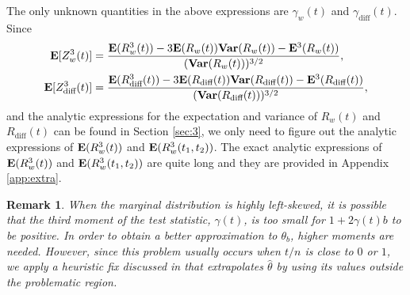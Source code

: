 \documentclass[arxiv, preprint]{imsart}
\numberwithin{equation}{section}
\theoremstyle{plain}
\newtheorem{remark}[thm]{Remark}
\begin{document}
The only unknown quantities in the above expressions are $\gamma_w(t)$ and $\gamma_\text{diff}(t)$.  %
Since 
\begin{align*}
 \mathbf{E}[Z^3_w(t)] & = \frac{\mathbf{E}(R^3_w(t))-3\mathbf{E}(R_w(t))\text{\bf{Var}}(R_w(t)) - \mathbf{E}^3(R_w(t))}{(\text{\bf{Var}}(R_w(t)))^{3/2}}, \\
\mathbf{E}[Z^3_\text{diff}(t)] & = \frac{\mathbf{E}(R^3_\text{diff}(t))-3\mathbf{E}(R_\text{diff}(t))\text{\bf{Var}}(R_\text{diff}(t)) - \mathbf{E}^3(R_\text{diff}(t))}{(\text{\bf{Var}}(R_\text{diff}(t)))^{3/2}},
\end{align*}
and the analytic expressions for the expectation and variance of $R_w(t)$ %
and $R_\text{diff}(t)$ can be found in Section \ref{sec:3}, we only need to figure out the analytic expressions of $\mathbf{E}(R^3_w(t))$ and $\mathbf{E}(R^3_w(t_1,t_2))$. The exact analytic expressions of $\mathbf{E}(R^3_w(t))$ and $\mathbf{E}(R^3_w(t_1,t_2))$ are quite long and they are provided in Appendix \ref{app:extra}. %

\begin{remark}
When the marginal distribution is highly left-skewed, it is possible that the third moment of the test statistic, $\gamma(t)$,  is too small for $1+2\gamma(t)b$ to be positive. In order to obtain a better approximation to $\theta_{b}$, higher moments are needed. However, since this problem usually occurs when $t/n$ is close to $0$ or $1$, we apply a heuristic fix discussed in \cite{chen2015graph} that  extrapolates $\hat{\theta}$ by using its values outside the problematic region. %
\end{remark}
\end{document}
